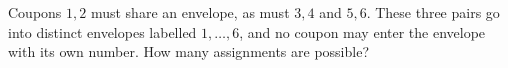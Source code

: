 Coupons $1,2$ must share an envelope, as must $3,4$ and $5,6$. These three pairs go into distinct envelopes labelled $1,\ldots,6$, and no coupon may enter the envelope with its own number. How many assignments are possible?
